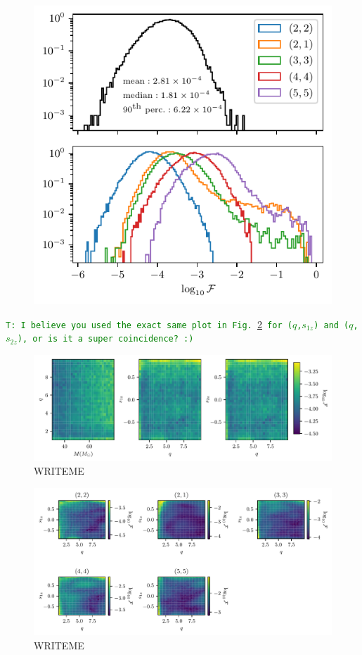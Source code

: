 \documentclass[twocolumn,showpacs,preprintnumbers,nofootinbib,prd,
superscriptaddress,10pt]{revtex4-1}
\newcommand{\tim}[1]{{\textcolor{green}{\texttt{T: #1}} }}
\begin{document}
\begin{figure}[t]
	\centering
	\includegraphics[scale = 1]{accuracy}
	\caption{}
	\label{fig:accuracy_hist}
\end{figure}

\tim{I believe you used the exact same plot in Fig.~\ref{fig:countour_plots} for ($q$,$s_{1z}$) and ($q$,$s_{2z}$), or is it a super coincidence? :)}
\begin{figure}[t]
	\centering
	\includegraphics[width=\textwidth]{colormesh}
	\caption{WRITEME}
	\label{fig:countour_plots}
\end{figure}

\begin{figure}[t]
	\centering
	\includegraphics[width=\textwidth]{colormesh_modes}
	\caption{WRITEME}
	\label{fig:countour_plots_modes}
\end{figure}
\end{document}
